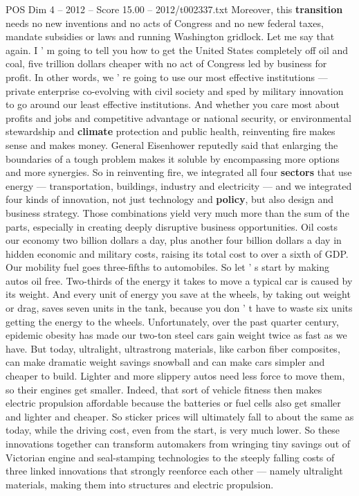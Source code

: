 \begin{textsample}{POS Dim 4 – 2012 – Score 15.00 – 2012/t002337.txt}
Moreover, this \textbf{transition} needs no new inventions and no acts of Congress and no new federal taxes, mandate subsidies or laws and running Washington gridlock.
Let me say that again.
I ' m going to tell you how to get the United States completely off oil and coal, five trillion dollars cheaper with no act of Congress led by business for profit.
In other words, we ' re going to use our most effective institutions — private enterprise co-evolving with civil society and sped by military innovation to go around our least effective institutions.
And whether you care most about profits and jobs and competitive advantage or national security, or environmental stewardship and \textbf{climate} protection and public health, reinventing fire makes sense and makes money.
General Eisenhower reputedly said that enlarging the boundaries of a tough problem makes it soluble by encompassing more options and more synergies.
So in reinventing fire, we integrated all four \textbf{sectors} that use energy — transportation, buildings, industry and electricity — and we integrated four kinds of innovation, not just technology and \textbf{policy}, but also design and business strategy.
Those combinations yield very much more than the sum of the parts, especially in creating deeply disruptive business opportunities.
Oil costs our economy two billion dollars a day, plus another four billion dollars a day in hidden economic and military costs, raising its total cost to over a sixth of GDP.
Our mobility fuel goes three-fifths to automobiles.
So let ' s start by making autos oil free.
Two-thirds of the energy it takes to move a typical car is caused by its weight.
And every unit of energy you save at the wheels, by taking out weight or drag, saves seven units in the tank, because you don ' t have to waste six units getting the energy to the wheels.
Unfortunately, over the past quarter century, epidemic obesity has made our two-ton steel cars gain weight twice as fast as we have.
But today, ultralight, ultrastrong materials, like carbon fiber composites, can make dramatic weight savings snowball and can make cars simpler and cheaper to build.
Lighter and more slippery autos need less force to move them, so their engines get smaller.
Indeed, that sort of vehicle fitness then makes electric propulsion affordable because the batteries or fuel cells also get smaller and lighter and cheaper.
So sticker prices will ultimately fall to about the same as today, while the driving cost, even from the start, is very much lower.
So these innovations together can transform automakers from wringing tiny savings out of Victorian engine and seal-stamping technologies to the steeply falling costs of three linked innovations that strongly reenforce each other — namely ultralight materials, making them into structures and electric propulsion.

\end{textsample}
